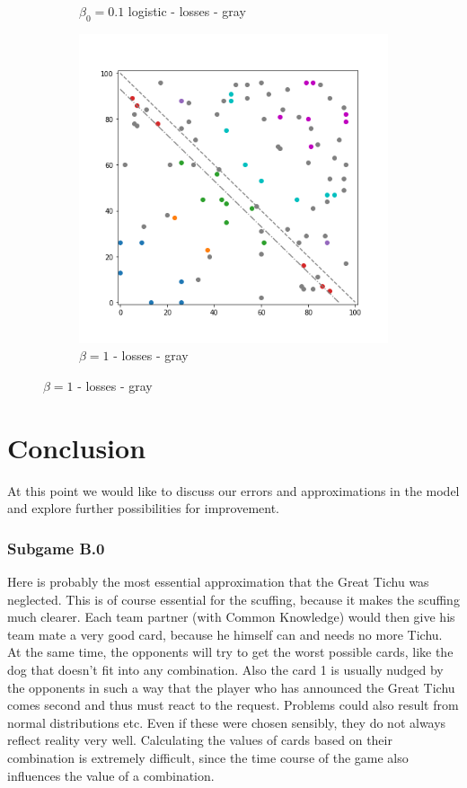 \begin{figure}[!ht]
\begin{subfigure}{.3\textwidth}
    	\caption{$\beta_0=0.1$ logistic - losses - gray}
    \end{subfigure}%
	\begin{subfigure}{.3\textwidth}%
    	\centering
    	\includegraphics[width=1\linewidth]{Bilder/simulation_4_4}
    	\caption{$\beta = 1$ - losses - gray}
	\end{subfigure}
\end{figure}

\section{Conclusion}
At this point we would like to discuss our errors and approximations in the model and explore further possibilities for improvement.

\subsubsection{Subgame B.0}
Here is probably the most essential approximation that the Great Tichu was neglected. This is of course essential for the scuffing, because it makes the scuffing much clearer. Each team partner (with Common Knowledge) would then give his team mate a very good card, because he himself can and needs no more Tichu. At the same time, the opponents will try to get the worst possible cards, like the dog that doesn't fit into any combination. Also the card 1 is usually nudged by the opponents in such a way that the player who has announced the Great Tichu comes second and thus must react to the request.
Problems could also result from normal distributions etc. Even if these were chosen sensibly, they do not always reflect reality very well. Calculating the values of cards based on their combination is extremely difficult, since the time course of the game also influences the value of a combination.

